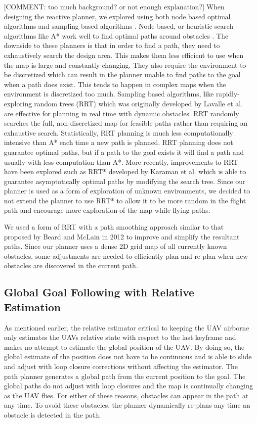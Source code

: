 \documentclass[letterpaper, 10 pt, conference]{ieeeconf}  %
\newcommand{\comment}[1]{{\color{red}[COMMENT: #1]}}
\begin{document}
\comment{too much background? or not enough explanation?} When designing the reactive planner, we explored using both node based optimal algorithms and sampling based algorithms \cite{Yang2016}. Node based, or heuristic search algorithms like A* work well to find optimal paths around obstacles \cite{Nilsson2011}. The downside to these planners is that in order to find a path, they need to exhaustively search the design area. This makes them less efficient to use when the map is large and constantly changing. They also require the environment to be discretized which can result in the planner unable to find paths to the goal when a path does exist. This tends to happen in complex maps when the environment is discretized too much. Sampling based algorithms, like rapidly-exploring random trees (RRT) which was originally developed by Lavalle et al. \cite{Lavalle1998} are effective for planning in real time with dynamic obstacles. RRT randomly searches the full, non-discretized map for feasible paths rather than requiring an exhaustive search. Statistically, RRT planning is much less computationally intensive than A* each time a new path is planned. RRT planning does not guarantee optimal paths, but if a path to the goal exists it will find a path and usually with less computation than A*. More recently, improvements to RRT have been explored such as RRT* developed by Karaman et al. \cite{Karaman2011} which is able to guarantee asymptotically optimal paths by modifying the search tree. Since our planner is used as a form of exploration of unknown environments, we decided to not extend the planner to use RRT* to allow it to be more random in the flight path and encourage more exploration of the map while flying paths.

We used a form of RRT with a path smoothing approach similar to that proposed by Beard and McLain in 2012 \cite{Beard2012} to improve and simplify the resultant paths. Since our planner uses a dense 2D grid map of all currently known obstacles, some adjustments are needed to efficiently plan and re-plan when new obstacles are discovered in the current path.

\subsection{Global Goal Following with Relative Estimation}

As mentioned earlier, the relative estimator critical to keeping the UAV airborne only estimates the UAVs relative state with respect to the last keyframe and makes no attempt to estimate the global position of the UAV. By doing so, the global estimate of the position does not have to be continuous and is able to slide and adjust with loop closure corrections without affecting the estimator. The path planner generates a global path from the current position to the goal. The global paths do not adjust with loop closures and the map is continually changing as the UAV flies. For either of these reasons, obstacles can appear in the path at any time. To avoid these obstacles, the planner dynamically re-plans any time an obstacle is detected in the path.
\end{document}
